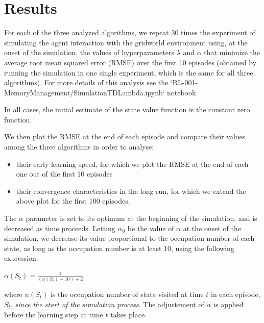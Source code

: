 \documentclass[11pt,A4paper]{article}
\begin{document}
\section{Results}

For each of the three analyzed algorithms, we repeat 30 times the experiment of simulating the agent interaction with the gridworld environment using, at the onset of the simulation, the values of hyperparameters $\lambda$ and $\alpha$ that minimize the average root mean squared error (RMSE) over the first 10 episodes (obtained by running the simulation in one single experiment, which is the same for all three algorithms). For more details of this analysis see the `RL-001-MemoryManagement/SimulationTDLambda.ipynb` notebook.

In all cases, the initial estimate of the state value function is the constant zero function.

We then plot the RMSE at the end of each episode and compare their values among the three algorithms in order to analyse:  
\begin{itemize}
\item their early learning speed, for which we plot the RMSE at the end of each one out of the first 10 episodes
\item their convergence characteristics in the long run, for which we extend the above plot for the first 100 episodes.
\end{itemize}

The $\alpha$ parameter is set to its optimum at the beginning of the simulation, and is decreased as time proceeds. Letting $\alpha_0$ be the value of $\alpha$ at the onset of the simulation, we decrease its value proportional to the occupation number of each state, as long as the occupation number is at least 10, using the following expression:  

\medskip
$\alpha(S_t) = \frac{1}{(n(S_t) - 10) + 2}$  
\medskip

where $n(S_t)$ is the occupation number of state visited at time $t$ in each episode, $S_t$, \emph{since the start of the simulation process}. The adjustement of $\alpha$ is applied before the learning step at time $t$ takes place.

\end{document}
